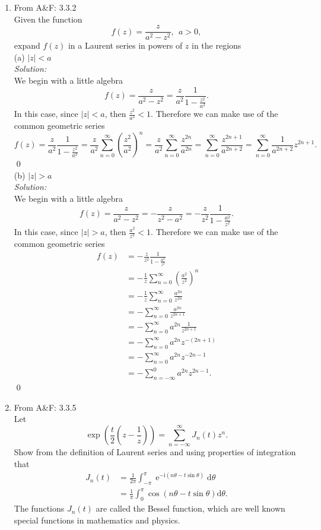 \documentclass[10pt]{amsart}
\newcommand{\D}{\mathrm{d}}
\newcommand{\I}{\mathrm{i}}
\DeclareMathOperator{\E}{e}
\theoremstyle{nonumberplain}
\begin{document}
\mline
\begin{enumerate}[label={\bf {\arabic*}:}]
\item  From A\&F: 3.3.2\\
Given the function $$f(z) = \frac z {a^2 - z^2}, \: \: a > 0,$$
expand $f(z)$ in a Laurent series in powers of $z$ in the regions \\

\noindent
(a) $|z| < a$ \\
\textit{Solution:} \\
We begin with a little algebra
$$ f(z) = \frac z {a^2 - z^2} = \frac z {a^2} \frac 1 {1 - \frac{z^2}{a^2}}. $$
In this case, since $|z| < a$, then $\frac {z^2}{a^2} < 1$.
Therefore we can make use of the common geometric series
$$
f(z) = \frac z {a^2} \frac 1 {1 - \frac{z^2}{a^2}}
	= \frac z {a^2} \sum_{n=0}^\infty \left(\frac{z^2}{a^2}\right)^n
	= \frac z {a^2} \sum_{n=0}^\infty \frac{z^{2n}}{a^{2n}}
	= \sum_{n=0}^\infty \frac{z^{2n + 1}}{a^{2n + 2}}
	= \sum_{n=0}^\infty \frac{1}{a^{2n + 2}} z^{2n + 1}.
$$
\qed \\

\noindent
(b) $|z| > a$ \\
\textit{Solution:} \\
We begin with a little algebra
$$ f(z) = \frac z {a^2 - z^2} = -\frac z {z^2 - a^2} = -\frac z {z^2} \frac 1 {1 - \frac{a^2}{z^2}}. $$
In this case, since $|z| > a$, then $\frac {a^2}{z^2} < 1$.
Therefore we can make use of the common geometric series
\begin{align*}
f(z) &= -\frac z {z^2} \frac 1 {1 - \frac{a^2}{z^2}} \\
	&= -\frac 1 {z} \sum_{n=0}^\infty \left(\frac{a^2}{z^2}\right)^n \\
	&= -\frac 1 {z} \sum_{n=0}^\infty \frac{a^{2n}}{z^{2n}} \\
	&= - \sum_{n=0}^\infty \frac{a^{2n}}{z^{2n + 1}} \\
	&= - \sum_{n=0}^\infty a^{2n}\frac{1}{z^{2n + 1}} \\
	&= - \sum_{n=0}^\infty a^{2n}z^{-(2n + 1)} \\
	&= - \sum_{n=0}^\infty a^{2n}z^{-2n -1} \\
	&= - \sum_{n=-\infty}^0 a^{2n}z^{2n -1}.
\end{align*}
\qed \\
\newpage

\item From A\&F: 3.3.5\\
Let
$$\exp\left(\frac t 2 \left( z - \frac1 z \right)\right) = \sum_{n = -\infty}^\infty J_n(t)z^n.$$
Show from the definition of Laurent series and using properties of integration that
\begin{align*}
J_n(t) &= \frac 1 {2 \pi} \int_{-\pi}^\pi \E^{-\I(n \theta - t \sin \theta)}\D \theta \\
	&= \frac 1 {\pi} \int_{0}^\pi \cos(n \theta - t \sin \theta)\D \theta.
\end{align*}
The functions $J_n(t)$ are called the Bessel function, which are well known special functions in mathematics and physics. \\


\end{enumerate}
\end{document}
